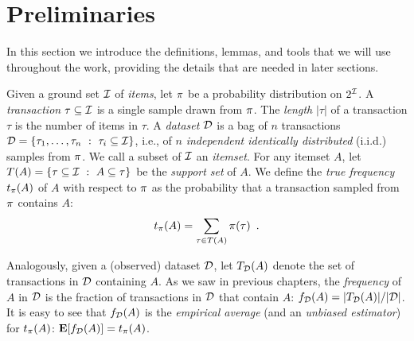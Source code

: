 \section{Preliminaries}\label{sec:prelims}
In this section we introduce the definitions, lemmas, and tools that we will use
throughout the work, providing the details that are needed in later sections.

Given a ground set ${\cal I}$ of \emph{items}, let $\pi$ be a
probability distribution on $2^{{\cal I}}$. A \emph{transaction} $\tau\subseteq{\cal I}$
is a single sample drawn from $\pi$. The \emph{length} $|\tau|$ of
a transaction $\tau$ is the number of items in $\tau$.
A \emph{dataset}
${\cal D}$ is a bag of $n$ transactions ${\cal D}=\{\tau_1,\dots,\tau_n ~:~
\tau_i\subseteq{\cal I}\}$, i.e., of $n$
\emph{independent identically distributed} (i.i.d.) samples from $\pi$. We
call a subset of ${\cal I}$ an \emph{itemset}. For any itemset $A$, let
$T(A)=\{\tau\subseteq{\cal I} ~:~ A\subseteq \tau\}$ be the \emph{support set}
of $A$. %
We define the
\emph{true frequency} $t_\pi(A)$ of $A$ with respect to $\pi$ as the
probability that a transaction sampled from $\pi$ contains $A$:
\[
t_\pi(A) = \sum_{\tau\in T(A)}\pi(\tau)\enspace.
\]


Analogously, given a (observed) dataset ${\cal D}$, let $T_{\cal D}(A)$ denote
the set of transactions in ${\cal D}$ containing $A$. As we saw in previous chapters,
the \emph{frequency} of $A$ in ${\cal D}$ is the fraction of transactions in ${\cal D}$
that contain $A$: $f_{\cal D}(A)= |T_{\cal D}(A)|/|{\cal D}|$. It is easy to see that
$f_{\cal D}(A)$ is the \emph{empirical average} (and an \emph{unbiased estimator})
for $t_\pi(A)$: ${\mathbf E}[f_{\cal D}(A)]=t_\pi(A)$.


